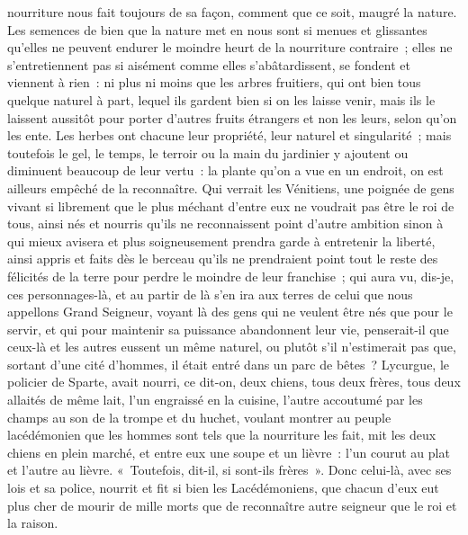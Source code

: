 \documentclass[french,twoside]{book} %
\begin{document}
nourriture nous fait toujours de sa façon, comment que ce soit, maugré la nature. Les semences de bien que la nature met en nous sont si menues et glissantes qu’elles ne peuvent endurer le moindre heurt de la nourriture contraire ; elles ne s’entretiennent pas si aisément comme elles s’abâtardissent, se fondent et viennent à rien : ni plus ni moins que les arbres fruitiers, qui ont bien tous quelque naturel à part, lequel ils gardent bien si on les laisse venir, mais ils le laissent aussitôt pour porter d’autres fruits étrangers et non les leurs, selon qu’on les ente. Les herbes ont chacune leur propriété, leur naturel et singularité ; mais toutefois le gel, le temps, le terroir ou la main du jardinier y ajoutent ou diminuent beaucoup de leur vertu : la plante qu’on a vue en un endroit, on est ailleurs empêché de la reconnaître. Qui verrait les Vénitiens, une poignée de gens vivant si librement que le plus méchant d’entre eux ne voudrait pas être le roi de tous, ainsi nés et nourris qu’ils ne reconnaissent point d’autre ambition sinon à qui mieux avisera et plus soigneusement prendra garde à entretenir la liberté, ainsi appris et faits dès le berceau qu’ils ne prendraient point tout le reste des félicités de la terre pour perdre le moindre de leur franchise ; qui aura vu, dis-je, ces personnages-là, et au partir de là s’en ira aux terres de celui que nous appellons Grand Seigneur, voyant là des gens qui ne veulent être nés que pour le servir, et qui pour maintenir sa puissance abandonnent leur vie, penserait-il que ceux-là et les autres eussent un même naturel, ou plutôt s’il n’estimerait pas que, sortant d’une cité d’hommes, il était entré dans un parc de bêtes ? Lycurgue, le policier de Sparte, avait nourri, ce dit-on, deux chiens, tous deux frères, tous deux allaités de même lait, l’un engraissé en la cuisine, l’autre accoutumé par les champs au son de la trompe et du huchet, voulant montrer au peuple lacédémonien que les hommes sont tels que la nourriture les fait, mit les deux chiens en plein marché, et entre eux une soupe et un lièvre : l’un courut au plat et l’autre au lièvre. « Toutefois, dit-il, si sont-ils frères ». Donc celui-là, avec ses lois et sa police, nourrit et fit si bien les Lacédémoniens, que chacun d’eux eut plus cher de mourir de mille morts que de reconnaître autre seigneur que le roi et la raison.\par
\end{document}
